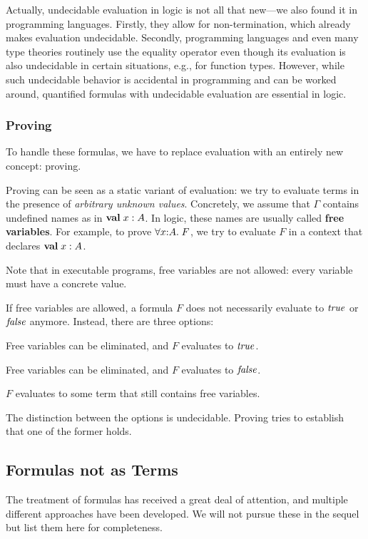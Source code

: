Actually, undecidable evaluation in logic is not all that new---we also found it in programming languages.
Firstly, they allow for non-termination, which already makes evaluation undecidable.
Secondly, programming languages and even many type theories routinely use the equality operator even though its evaluation is also undecidable in certain situations, e.g., for function types.
However, while such undecidable behavior is accidental in programming and can be worked around, quantified formulas with undecidable evaluation are essential in logic.

\subsubsection{Proving}

To handle these formulas, we have to replace evaluation with an entirely new concept: proving.

Proving can be seen as a static variant of evaluation: we try to evaluate terms in the presence of \emph{arbitrary unknown values}.
Concretely, we assume that $\Gamma$ contains undefined names as in $\aval{x}{A}{}$.
In logic, these names are usually called \textbf{free variables}.
For example, to prove $\afa[A]{x}{F}$, we try to evaluate $F$ in a context that declares $\aval{x}{A}{}$.

Note that in executable programs, free variables are not allowed: every variable must have a concrete value.

If free variables are allowed, a formula $F$ does not necessarily evaluate to $\mathit{true}$ or $\mathit{false}$ anymore.
Instead, there are three options:
\begin{compactitem}
 \item Free variables can be eliminated, and $F$ evaluates to $\mathit{true}$.
 \item Free variables can be eliminated, and $F$ evaluates to $\mathit{false}$.
 \item $F$ evaluates to some term that still contains free variables.
\end{compactitem}

The distinction between the options is undecidable.
Proving tries to establish that one of the former holds.

\subsection{Formulas not as Terms}

The treatment of formulas has received a great deal of attention, and multiple different approaches have been developed.
We will not pursue these in the sequel but list them here for completeness.

